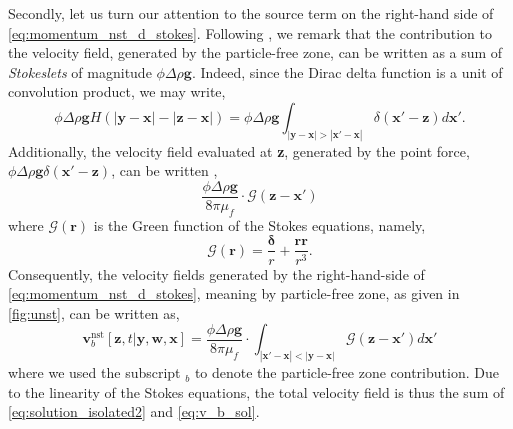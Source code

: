 Secondly, let us turn our attention to the source term on the right-hand side of \ref{eq:momentum_nst_d_stokes}. 
Following \citet{zhang2021ensemble}, we remark that the contribution to the velocity field, generated by the particle-free zone, can be written as a sum of \textit{Stokeslets} of magnitude $\phi\Delta \rho \textbf{g}$.
Indeed, since the Dirac delta function is a unit of convolution product, we may write, 
\begin{equation}
    \phi \Delta\rho  \textbf{g} H(|\textbf{y} - \textbf{x}| - |\textbf{z} - \textbf{x}|)
    = 
    \phi \Delta\rho  \textbf{g} 
    \int_{|\textbf{y} - \textbf{x}| > |\textbf{x}' - \textbf{x}|}
    \delta(\textbf{x}'-\textbf{z})
    d\textbf{x}'. 
\end{equation}
Additionally, the velocity field evaluated at \textbf{z}, generated by the point force,  $\phi\Delta \rho \textbf{g}\delta(\textbf{x}' - \textbf{z})$, can be written \citep{pozrikidis1992boundary}, 
\begin{equation}
    \frac{\phi\Delta \rho \textbf{g}}{8\pi \mu_f}\cdot \mathcal{G}(\textbf{z} - \textbf{x}')
\end{equation}
where $\mathcal{G}(\textbf{r})$ is the Green function of the Stokes equations, namely, 
\begin{equation}
    \mathcal{G}(\textbf{r}) = \frac{\bm\delta}{r} + \frac{\textbf{rr}}{r^3}.
\end{equation}
Consequently, the velocity fields generated by the right-hand-side of \ref{eq:momentum_nst_d_stokes}, meaning by particle-free zone, as given in \ref{fig:unst}, can be written as, 
\begin{equation}
    \textbf{v}_b^\text{nst}[\textbf{z},t|\textbf{y},\textbf{w},\textbf{x}]
    = 
    \frac{\phi\Delta \rho \textbf{g}}{8\pi \mu_f}\cdot 
    \int_{|\textbf{x}'-\textbf{x}|< |\textbf{y}- \textbf{x}|}
    \mathcal{G}(\textbf{z} - \textbf{x}')
    d\textbf{x}'
    \label{eq:v_b_sol}
\end{equation}
where we used the subscript $_b$ to denote the particle-free zone contribution. 
Due to the linearity of the Stokes equations, the total velocity field is thus the sum of \ref{eq:solution_isolated2} and \ref{eq:v_b_sol}. 

